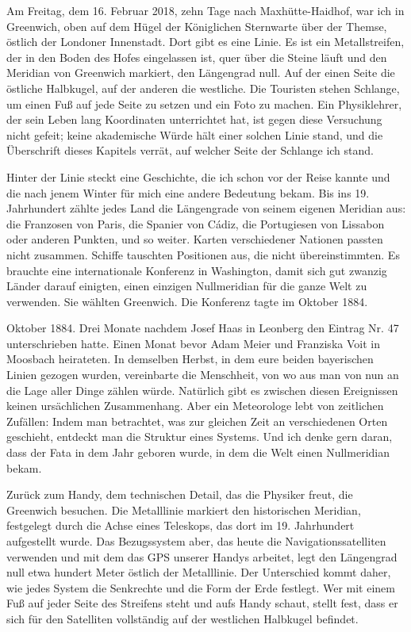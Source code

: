 \documentclass[
  ngerman,
  11pt,
  openany]{book}
\begin{document}
Am Freitag, dem 16. Februar 2018, zehn Tage nach Maxhütte-Haidhof, war
ich in Greenwich, oben auf dem Hügel der Königlichen Sternwarte über der
Themse, östlich der Londoner Innenstadt. Dort gibt es eine Linie. Es ist
ein Metallstreifen, der in den Boden des Hofes eingelassen ist, quer
über die Steine läuft und den Meridian von Greenwich markiert, den
Längengrad null. Auf der einen Seite die östliche Halbkugel, auf der
anderen die westliche. Die Touristen stehen Schlange, um einen Fuß auf
jede Seite zu setzen und ein Foto zu machen. Ein Physiklehrer, der sein
Leben lang Koordinaten unterrichtet hat, ist gegen diese Versuchung
nicht gefeit; keine akademische Würde hält einer solchen Linie stand,
und die Überschrift dieses Kapitels verrät, auf welcher Seite der
Schlange ich stand.

Hinter der Linie steckt eine Geschichte, die ich schon vor der Reise
kannte und die nach jenem Winter für mich eine andere Bedeutung bekam.
Bis ins 19. Jahrhundert zählte jedes Land die Längengrade von seinem
eigenen Meridian aus: die Franzosen von Paris, die Spanier von Cádiz,
die Portugiesen von Lissabon oder anderen Punkten, und so weiter. Karten
verschiedener Nationen passten nicht zusammen. Schiffe tauschten
Positionen aus, die nicht übereinstimmten. Es brauchte eine
internationale Konferenz in Washington, damit sich gut zwanzig Länder
darauf einigten, einen einzigen Nullmeridian für die ganze Welt zu
verwenden. Sie wählten Greenwich. Die Konferenz tagte im Oktober 1884.

Oktober 1884. Drei Monate nachdem Josef Haas in Leonberg den Eintrag Nr.
47 unterschrieben hatte. Einen Monat bevor Adam Meier und Franziska Voit
in Moosbach heirateten. In demselben Herbst, in dem eure beiden
bayerischen Linien gezogen wurden, vereinbarte die Menschheit, von wo
aus man von nun an die Lage aller Dinge zählen würde. Natürlich gibt es
zwischen diesen Ereignissen keinen ursächlichen Zusammenhang. Aber ein
Meteorologe lebt von zeitlichen Zufällen: Indem man betrachtet, was zur
gleichen Zeit an verschiedenen Orten geschieht, entdeckt man die
Struktur eines Systems. Und ich denke gern daran, dass der Fata in dem
Jahr geboren wurde, in dem die Welt einen Nullmeridian bekam.

Zurück zum Handy, dem technischen Detail, das die Physiker freut, die
Greenwich besuchen. Die Metalllinie markiert den historischen Meridian,
festgelegt durch die Achse eines Teleskops, das dort im 19. Jahrhundert
aufgestellt wurde. Das Bezugssystem aber, das heute die
Navigationssatelliten verwenden und mit dem das GPS unserer Handys
arbeitet, legt den Längengrad null etwa hundert Meter östlich der
Metalllinie. Der Unterschied kommt daher, wie jedes System die
Senkrechte und die Form der Erde festlegt. Wer mit einem Fuß auf jeder
Seite des Streifens steht und aufs Handy schaut, stellt fest, dass er
sich für den Satelliten vollständig auf der westlichen Halbkugel
befindet.
\end{document}

